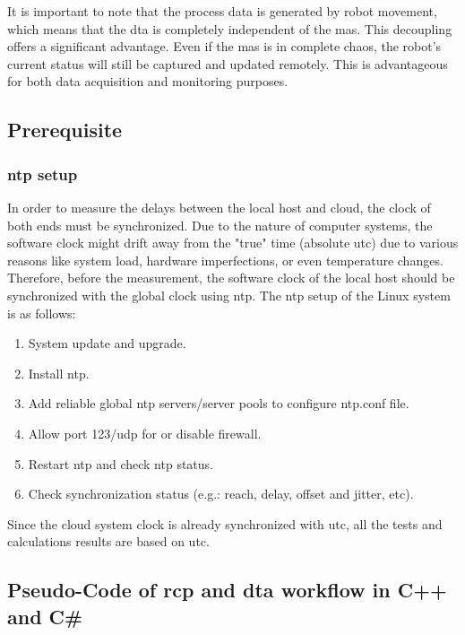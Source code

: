 It is important to note that the process data is generated by robot movement, 
which means that the \gls{dta} is completely independent of the \gls{mas}. This decoupling 
offers a 
significant advantage. Even if the \gls{mas} is in complete chaos, the robot's current status 
will still be captured and updated remotely. This is advantageous for both data acquisition 
and monitoring purposes.



\subsection{Prerequisite} \label{chap: ntpsetup}
\subsubsection{\gls{ntp} setup}
In order to measure the delays between the local host and cloud, the clock of both ends must be synchronized. 
Due to the nature of computer systems, the software clock might drift away from the "true" time (absolute \gls{utc}) 
due to various reasons like system load, hardware imperfections, or even temperature changes.
Therefore, before the measurement, the software clock of the local host should be synchronized with the global 
clock using \gls{ntp}. 
The \gls{ntp} setup of the Linux system is as follows:  

\begin{enumerate}
    \item System update and upgrade.
    \item Install \gls{ntp}.
    \item Add reliable global \gls{ntp} servers/server pools to configure ntp.conf file.
    \item Allow port 123/udp for or disable firewall.
    \item Restart \gls{ntp} and check \gls{ntp} status.
    \item Check synchronization status (e.g.: reach, delay, offset and jitter, etc).
    \end{enumerate}

Since the cloud system clock is already synchronized with \gls{utc}, all the tests and calculations results are based on \gls{utc}. 

\subsection{Pseudo-Code of \gls{rcp} and \gls{dta} workflow in C++ and C\#}\label{chap: RCPDTAPseudo}


